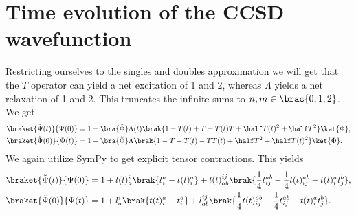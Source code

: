     \section{Time evolution of the CCSD wavefunction}
        Restricting ourselves to the singles and doubles approximation we will
        get that the $T$ operator can yield a net excitation of 1 and 2, whereas
        $\Lambda$ yields a net relaxation of 1 and 2. This truncates the
        infinite sums to $n, m \in \brac{0, 1, 2}$. We get
        \begin{align}
            \braket{\tilde{\Psi}(t)}{\Psi(0)}
            &= 1
            + \bra{\tilde{\Phi}}\Lambda(t)\brak{
                1 - T(t) + T - T(t)T
                + \half T(t)^2 + \half T^2
            }\ket{\Phi},
            \\
            \braket{\tilde{\Psi}(0)}{\Psi(t)}
            &= 1
            + \bra{\tilde{\Phi}}\Lambda\brak{
                1 - T + T(t) - TT(t)
                + \half T^2 + \half T(t)^2
            }\ket{\Phi}.
        \end{align}
        We again utilize SymPy\cite{sympy} to get explicit tensor contractions.
        This yields
        \begin{align}
            \braket{\tilde{\Psi}(t)}{\Psi(0)}
            &=
            1
            + l(t)^{i}_{a}
            \brak{
                t^{a}_{i}
                - t(t)^{a}_{i}
            }
            + l(t)^{ij}_{ab}\brak{
                \frac{1}{4} t^{ab}_{ij}
                - \frac{1}{4} t(t)^{ab}_{ij}
                - t(t)^{a}_{i} t^{b}_{j}
            },
            \\
            \braket{\tilde{\Psi}(0)}{\Psi(t)}
            &=
            1
            + l^{i}_{a}\brak{
                t(t)^{a}_{i}
                - t^{a}_{i}
            }
            + l^{ij}_{ab}\brak{
                \frac{1}{4} t(t)^{ab}_{ij}
                - \frac{1}{4} t^{ab}_{ij}
                - t(t)^{a}_{i} t^{b}_{j}
            }.
        \end{align}
